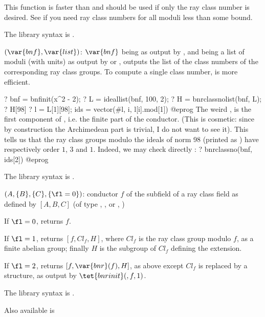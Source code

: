 This function is faster than  and should be used if only the
ray class number is desired. See  if you need ray class
numbers for all moduli less than some bound.

The library syntax is .

$(\var{bnf},\var{list})$: \label{se:bnrclassnolist}$\var{bnf}$ being as
output by , and  being a list of moduli (with units) as
output by  or , outputs the list of the
class numbers of the corresponding ray class groups. To compute a single
class number,  is more efficient.

\bprog
? bnf = bnfinit(x^2 - 2);
? L = ideallist(bnf, 100, 2);
? H = bnrclassnolist(bnf, L);
? H[98]
? l = L[1][98]; ids = vector(#l, i, l[i].mod[1])
@eprog
The weird , is the first component of , i.e.
the finite part of the conductor. (This is cosmetic: since by construction
the Archimedean part is trivial, I do not want to see it). This tells us that
the ray class groups modulo the ideals of norm 98 (printed as ) have
respectively order $1$, $3$ and $1$. Indeed, we may check directly :
\bprog
? bnrclassno(bnf, ids[2])
@eprog

The library syntax is .

$(A,\{B\},\{C\},\{\fl=0\})$: \label{se:bnrconductor}conductor $f$ of the subfield of a ray class field as defined by $[A,B,C]$
(of type ,
,
 or
,
)

If $\fl = 0$, returns $f$.

If $\fl = 1$, returns $[f, Cl_f, H]$, where $Cl_f$ is the ray class group
modulo $f$, as a finite abelian group; finally $H$ is the subgroup of $Cl_f$
defining the extension.

If $\fl = 2$, returns $[f, \var{bnr}(f), H]$, as above except $Cl_f$ is
replaced by a  structure, as output by $\tet{bnrinit}(,f,1)$.

The library syntax is .

Also available is 


